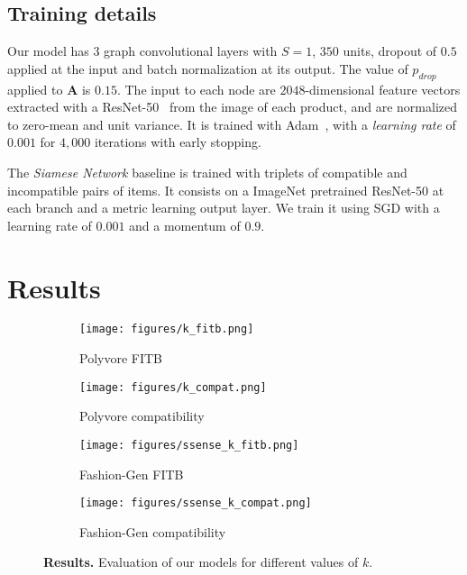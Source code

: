 \documentclass[10pt,twocolumn,letterpaper]{article}
\begin{document}
\subsection{Training details}
\label{ssec:training_details}
Our model has $3$ graph convolutional layers with $S=1$, $350$ units, dropout of $0.5$ applied at the input and batch normalization at its output. The value of $p_{drop}$ applied to $\boldsymbol{A}$ is $0.15$. 
The input to each node are $2048$-dimensional feature vectors extracted with a ResNet-50~\cite{he2016deep} from the image of each product, and are normalized to zero-mean and unit variance. It is trained with Adam~\cite{kingma2014adam}, with a \textit{learning rate} of $0.001$ for $4,000$ iterations with early stopping.

The \emph{Siamese Network} baseline is trained with triplets of compatible and incompatible pairs of items. It consists on a ImageNet pretrained ResNet-50 at each branch and a metric learning output layer. We train it using SGD with a learning rate of $0.001$ and a momentum of $0.9$.


\section{Results}
\label{sec:results}



\begin{figure*}[t]
\begin{center}
\begin{subfigure}{.24\textwidth}
  \centering
  \texttt{[image: figures/k\_fitb.png]}
  \caption{Polyvore FITB}
  \label{fig:k_fitb_poly}
\end{subfigure}\begin{subfigure}{.245\textwidth}
  \centering
  \texttt{[image: figures/k\_compat.png]}
  \caption{Polyvore compatibility}
  \label{fig:k_compat_poly}
\end{subfigure}\begin{subfigure}{.24\textwidth}
  \centering
  \texttt{[image: figures/ssense\_k\_fitb.png]}
  \caption{Fashion-Gen FITB}
  \label{fig:k_fitb_ssense}
\end{subfigure}\begin{subfigure}{.245\textwidth}
  \centering
  \texttt{[image: figures/ssense\_k\_compat.png]}
  \caption{Fashion-Gen compatibility}
  \label{fig:k_compat_ssense}
\end{subfigure}
\end{center}
\caption{\textbf{Results.} Evaluation of our models for different values of $k$.}
\label{fig:k}
\end{figure*}
\end{document}
